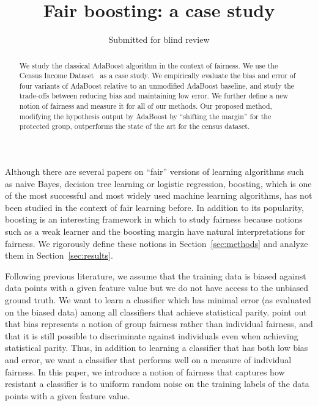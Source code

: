 \documentclass{article}
\title{Fair boosting: a case study}
\author{Submitted for blind review}
\begin{document}
\maketitle

\begin{abstract} 

We study the classical AdaBoost algorithm in the context of fairness.
We use the Census Income Dataset~\citep{UCIAdult} as a case study.
We empirically evaluate the bias and error of four %
variants of AdaBoost relative to an unmodified AdaBoost baseline, and study the
trade-offs between reducing bias and maintaining low error. We further define a 
new notion of fairness and measure it for all of our methods.  Our
proposed method, modifying the hypothesis output by AdaBoost by ``shifting the
margin'' for the protected group, outperforms the state of the art for the census
dataset.

\end{abstract}

Although there are several papers on ``fair'' versions of learning algorithms
such as naive Bayes, decision tree learning or logistic regression, boosting,
which is one of the most successful and most widely used machine learning
algorithms, has not been studied in the context of fair learning before. In
addition to its popularity, boosting is an interesting framework in which to
study fairness because notions such as a weak learner and the boosting margin
have natural interpretations for fairness. We rigorously define these notions
in Section~\ref{sec:methods} and analyze them in Section~\ref{sec:results}.

Following previous literature, we assume that the training data is biased
against data points with a given feature value but we do not have access to the
unbiased ground truth. We want to learn a classifier which has minimal error
(as evaluated on the biased data) among all classifiers that achieve
statistical parity.  \citet{DworkHPR12} point out that bias represents
a notion of group fairness rather than individual fairness, and that
it is still possible to discriminate against individuals even when
achieving statistical parity.  Thus, in addition to learning a classifier
that has both low bias and error, we want a classifier that performs well
on a measure of individual fairness.
In this paper, we introduce a notion of fairness that captures how resistant
a classifier is to uniform random noise on the training labels of the data points
with a given feature value.
 
\end{document}

